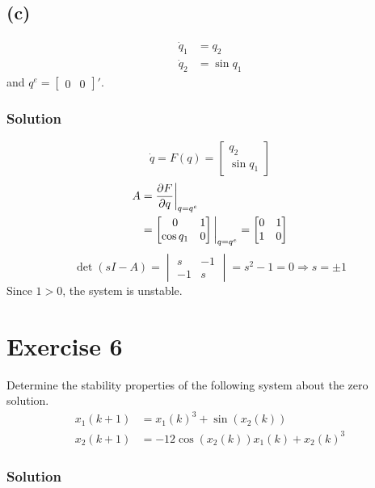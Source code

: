 \documentclass[12pt,a4paper]{article}
\begin{document}
	
	
	
	
	
	
	
	\subsection*{(c)}
	\begin{align*}
		\dot{q}_{1} &= q_{2} \\
		\dot{q}_{2} &= \sin q_{1}
	\end{align*}
	and $q^{e}=\begin{bmatrix} 0 & 0 \end{bmatrix}'$.
	
	\subsubsection*{Solution}
	\[
	\dot q = F(q) = \begin{bmatrix}
		q_2 \\ \sin q_1
	\end{bmatrix}
	\]
	\begin{align*}
		A &= {\partial F \over \partial q}\bigg|_{q = q^e} \\
		&= \begin{bmatrix}
			0 & 1 \\ \cos q_1 & 0
		\end{bmatrix} \bigg|_{q = q^e} = \begin{bmatrix}
		 	0 & 1 \\ 1 & 0
		 \end{bmatrix}
	\end{align*}
	\[
	\det (sI - A) = \begin{vmatrix}
		s & -1 \\ -1 & s 
	\end{vmatrix} = s^2 - 1 = 0 \Rightarrow s = \pm 1
	\]
	Since $1 > 0$,  the system is unstable.
	
	\section*{Exercise 6}
	Determine the stability properties of the following system about the zero solution.
	\begin{align}
		x_{1}(k+1) &= x_{1}(k)^{3}+\sin(x_{2}(k)) \\
		x_{2}(k+1) &= -12\cos(x_{2}(k))x_{1}(k)+x_{2}(k)^{3}
	\end{align}
	
	\subsubsection*{Solution}
	
\end{document}

